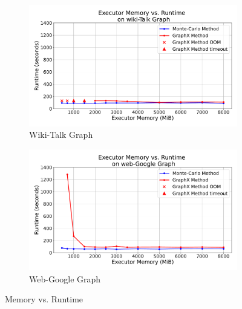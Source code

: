 \begin{figure}[H]
    \centering
    \begin{subfigure}[t]{0.5\linewidth}
        \centering
        \includegraphics[width=\linewidth]{images/plots/wiki-Talk/memory_vs_runtime_wiki_talk.pdf}
        \caption{Wiki-Talk Graph}
        \label{fig:wikirun}
    \end{subfigure}\hfill
    \begin{subfigure}[t]{0.5\linewidth}
        \centering
        \includegraphics[width=\linewidth]{images/plots/web-Google/memory_vs_runtime_web_google.pdf}
        \caption{Web-Google Graph}
        \label{fig:wikigibhrs}
    \end{subfigure}
    \caption{Memory vs. Runtime}
    \label{fig:wiki-comparison}
\end{figure}

